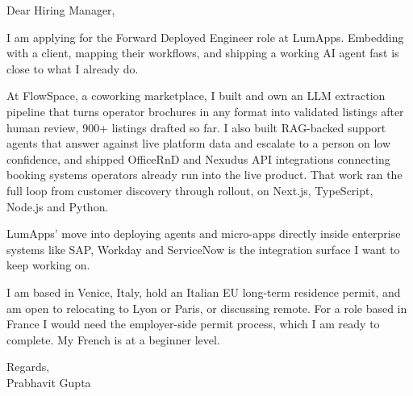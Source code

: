 \documentclass[a4paper,11pt]{article}
\begin{document}
Dear Hiring Manager,

I am applying for the Forward Deployed Engineer role at LumApps. Embedding with a client, mapping their workflows, and shipping a working AI agent fast is close to what I already do.

At FlowSpace, a coworking marketplace, I built and own an LLM extraction pipeline that turns operator brochures in any format into validated listings after human review, 900+ listings drafted so far. I also built RAG-backed support agents that answer against live platform data and escalate to a person on low confidence, and shipped OfficeRnD and Nexudus API integrations connecting booking systems operators already run into the live product. That work ran the full loop from customer discovery through rollout, on Next.js, TypeScript, Node.js and Python.

LumApps' move into deploying agents and micro-apps directly inside enterprise systems like SAP, Workday and ServiceNow is the integration surface I want to keep working on.

I am based in Venice, Italy, hold an Italian EU long-term residence permit, and am open to relocating to Lyon or Paris, or discussing remote. For a role based in France I would need the employer-side permit process, which I am ready to complete. My French is at a beginner level.

Regards,\\
Prabhavit Gupta
\end{document}
